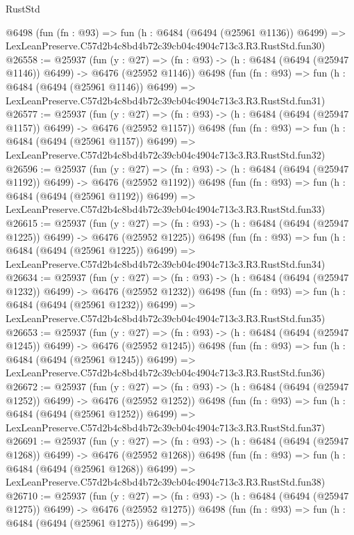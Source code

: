 \begin{lexlean}{RustStd}
\begin{coremodule}
    @6498
    (fun (fn : @93) =>
    fun (h : @6484 (@6494 (@25961 @1136)) @6499) =>
    LexLeanPreserve.C57d2b4c8bd4b72c39cb04c4904c713c3.R3.RustStd.fun30)
@26558 := @25937
    (fun (y : @27) =>
    (fn : @93) -> (h : @6484 (@6494 (@25947 @1146)) @6499) -> @6476 (@25952 @1146))
    @6498
    (fun (fn : @93) =>
    fun (h : @6484 (@6494 (@25961 @1146)) @6499) =>
    LexLeanPreserve.C57d2b4c8bd4b72c39cb04c4904c713c3.R3.RustStd.fun31)
@26577 := @25937
    (fun (y : @27) =>
    (fn : @93) -> (h : @6484 (@6494 (@25947 @1157)) @6499) -> @6476 (@25952 @1157))
    @6498
    (fun (fn : @93) =>
    fun (h : @6484 (@6494 (@25961 @1157)) @6499) =>
    LexLeanPreserve.C57d2b4c8bd4b72c39cb04c4904c713c3.R3.RustStd.fun32)
@26596 := @25937
    (fun (y : @27) =>
    (fn : @93) -> (h : @6484 (@6494 (@25947 @1192)) @6499) -> @6476 (@25952 @1192))
    @6498
    (fun (fn : @93) =>
    fun (h : @6484 (@6494 (@25961 @1192)) @6499) =>
    LexLeanPreserve.C57d2b4c8bd4b72c39cb04c4904c713c3.R3.RustStd.fun33)
@26615 := @25937
    (fun (y : @27) =>
    (fn : @93) -> (h : @6484 (@6494 (@25947 @1225)) @6499) -> @6476 (@25952 @1225))
    @6498
    (fun (fn : @93) =>
    fun (h : @6484 (@6494 (@25961 @1225)) @6499) =>
    LexLeanPreserve.C57d2b4c8bd4b72c39cb04c4904c713c3.R3.RustStd.fun34)
@26634 := @25937
    (fun (y : @27) =>
    (fn : @93) -> (h : @6484 (@6494 (@25947 @1232)) @6499) -> @6476 (@25952 @1232))
    @6498
    (fun (fn : @93) =>
    fun (h : @6484 (@6494 (@25961 @1232)) @6499) =>
    LexLeanPreserve.C57d2b4c8bd4b72c39cb04c4904c713c3.R3.RustStd.fun35)
@26653 := @25937
    (fun (y : @27) =>
    (fn : @93) -> (h : @6484 (@6494 (@25947 @1245)) @6499) -> @6476 (@25952 @1245))
    @6498
    (fun (fn : @93) =>
    fun (h : @6484 (@6494 (@25961 @1245)) @6499) =>
    LexLeanPreserve.C57d2b4c8bd4b72c39cb04c4904c713c3.R3.RustStd.fun36)
@26672 := @25937
    (fun (y : @27) =>
    (fn : @93) -> (h : @6484 (@6494 (@25947 @1252)) @6499) -> @6476 (@25952 @1252))
    @6498
    (fun (fn : @93) =>
    fun (h : @6484 (@6494 (@25961 @1252)) @6499) =>
    LexLeanPreserve.C57d2b4c8bd4b72c39cb04c4904c713c3.R3.RustStd.fun37)
@26691 := @25937
    (fun (y : @27) =>
    (fn : @93) -> (h : @6484 (@6494 (@25947 @1268)) @6499) -> @6476 (@25952 @1268))
    @6498
    (fun (fn : @93) =>
    fun (h : @6484 (@6494 (@25961 @1268)) @6499) =>
    LexLeanPreserve.C57d2b4c8bd4b72c39cb04c4904c713c3.R3.RustStd.fun38)
@26710 := @25937
    (fun (y : @27) =>
    (fn : @93) -> (h : @6484 (@6494 (@25947 @1275)) @6499) -> @6476 (@25952 @1275))
    @6498
    (fun (fn : @93) =>
    fun (h : @6484 (@6494 (@25961 @1275)) @6499) =>

\end{coremodule}
\end{lexlean}
